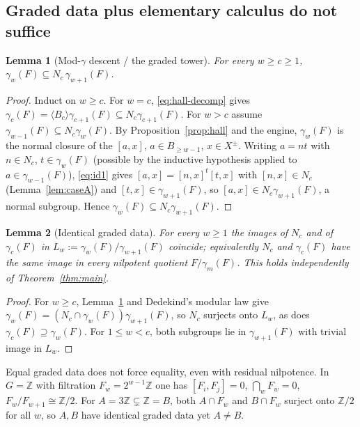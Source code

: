 \documentclass{amsart}
\newtheorem{lemma}{Lemma}
\theoremstyle{definition}
\theoremstyle{remark}
\begin{document}
\subsection{Graded data plus elementary calculus do not suffice}

\begin{lemma}[Mod-$\gamma$ descent / the graded tower]\label{lem:moddescent}
For every $w\ge c\ge1$, $\gamma_w(F)\subseteq N_c\,\gamma_{w+1}(F)$.
\end{lemma}
\begin{proof}
Induct on $w\ge c$. For $w=c$, \eqref{eq:hall-decomp} gives
$\gamma_c(F)=\langle B_c\rangle\gamma_{c+1}(F)\subseteq N_c\gamma_{c+1}(F)$. For
$w>c$ assume $\gamma_{w-1}(F)\subseteq N_c\gamma_w(F)$. By
Proposition~\ref{prop:hall} and the engine, $\gamma_w(F)$ is the normal closure of
the $[a,x]$, $a\in B_{\ge w-1}$, $x\in X^{\pm}$. Writing $a=nt$ with $n\in N_c$,
$t\in\gamma_w(F)$ (possible by the inductive hypothesis applied to
$a\in\gamma_{w-1}(F)$), \eqref{eq:id1} gives $[a,x]=[n,x]^t[t,x]$ with
$[n,x]\in N_c$ (Lemma~\ref{lem:caseA}) and $[t,x]\in\gamma_{w+1}(F)$, so
$[a,x]\in N_c\gamma_{w+1}(F)$, a normal subgroup. Hence
$\gamma_w(F)\subseteq N_c\gamma_{w+1}(F)$.
\end{proof}

\begin{lemma}[Identical graded data]\label{lem:gradedNc}
For every $w\ge1$ the images of $N_c$ and of $\gamma_c(F)$ in
$L_w:=\gamma_w(F)/\gamma_{w+1}(F)$ coincide; equivalently $N_c$ and $\gamma_c(F)$
have the same image in every nilpotent quotient $F/\gamma_m(F)$. This holds
independently of Theorem~\ref{thm:main}.
\end{lemma}
\begin{proof}
For $w\ge c$, Lemma~\ref{lem:moddescent} and Dedekind's modular law give
$\gamma_w(F)=(N_c\cap\gamma_w(F))\gamma_{w+1}(F)$, so $N_c$ surjects onto $L_w$, as
does $\gamma_c(F)\supseteq\gamma_w(F)$. For $1\le w<c$, both subgroups lie in
$\gamma_{w+1}(F)$ with trivial image in $L_w$.
\end{proof}

\begin{example}\label{ex:Z}
Equal graded data does not force equality, even with residual nilpotence. In
$G=\mathbb Z$ with filtration $F_w=2^{w-1}\mathbb Z$ one has $[F_i,F_j]=0$,
$\bigcap_w F_w=0$, $F_w/F_{w+1}\cong\mathbb Z/2$. For $A=3\mathbb Z\subsetneq\mathbb
Z=B$, both $A\cap F_w$ and $B\cap F_w$ surject onto $\mathbb Z/2$ for all $w$, so
$A,B$ have identical graded data yet $A\ne B$.
\end{example}
\end{document}
